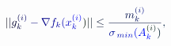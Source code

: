 \documentclass[12pt]{article}
\begin{document}
\makeatletter
\renewcommand*{\@textcolor}[3]{%
  \protect\leavevmode
  \begingroup
    \color#1{#2}#3%
  \endgroup
}
\makeatother
\begin{displaymath}
\mathcolor[RGB]{0,0,15}{|} \mathcolor[RGB]{0,0,30}{|} \mathcolor[RGB]{0,0,45}{g} _ { \mathcolor[RGB]{0,0,60}{k} } ^ { \mathcolor[RGB]{0,0,75}{(} \mathcolor[RGB]{0,0,90}{i} \mathcolor[RGB]{0,0,105}{)} } \mathcolor[RGB]{0,0,120}{-} \mathcolor[RGB]{0,0,135}{\nabla} \mathcolor[RGB]{0,0,150}{f} _ { \mathcolor[RGB]{0,0,165}{k} } \mathcolor[RGB]{0,0,180}{(} \mathcolor[RGB]{0,0,195}{x} _ { \mathcolor[RGB]{0,0,210}{k} } ^ { \mathcolor[RGB]{0,0,225}{(} \mathcolor[RGB]{0,0,240}{i} \mathcolor[RGB]{0,0,255}{)} } \mathcolor[RGB]{0,15,0}{)} \mathcolor[RGB]{0,15,15}{|} \mathcolor[RGB]{0,15,30}{|} \mathcolor[RGB]{0,15,45}{\leq} \mathcolor[RGB]{0,15,60}{\frac { \mathcolor[RGB]{0,15,75}{m} _ { \mathcolor[RGB]{0,15,90}{k} } ^ { \mathcolor[RGB]{0,15,105}{(} \mathcolor[RGB]{0,15,120}{i} \mathcolor[RGB]{0,15,135}{)} } } { \mathcolor[RGB]{0,15,150}{\sigma} _ { \mathcolor[RGB]{0,15,165}{\operatorname*} { \mathcolor[RGB]{0,15,180}{m} \mathcolor[RGB]{0,15,195}{i} \mathcolor[RGB]{0,15,210}{n} } } \mathcolor[RGB]{0,15,225}{(} \mathcolor[RGB]{0,15,240}{A} _ { \mathcolor[RGB]{0,15,255}{k} } ^ { \mathcolor[RGB]{0,30,0}{(} \mathcolor[RGB]{0,30,15}{i} \mathcolor[RGB]{0,30,30}{)} } \mathcolor[RGB]{0,30,45}{)} } } \mathcolor[RGB]{0,30,60}{,}
\end{displaymath}
\end{document}
